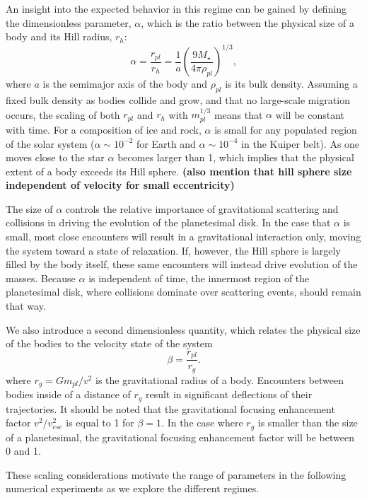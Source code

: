 \documentclass[twocolumn]{aastex63}
\begin{document}
An insight into the expected behavior in this regime can be gained by
defining the dimensionless parameter, $\alpha$, which is the ratio
between the physical size of a body and its Hill radius, $r_{h}$:
\begin{equation}\label{eq:alpha}
	\alpha = \frac{r_{pl}}{r_{h}} = \frac{1}{a} \left( \frac{9 M_{\star}}{4 \pi \rho_{pl}} \right)^{1/3},
\end{equation}
where $a$ is the semimajor axis of the body and $\rho_{pl}$ is its
bulk density. Assuming a fixed bulk density as bodies collide and
grow, and that no large-scale migration occurs, the scaling of both
$r_{pl}$ and $r_{h}$ with $m_{pl}^{1/3}$ means that $\alpha$ will be
constant with time. For a composition of ice and rock, $\alpha$ is
small for any populated region of the solar system ($\alpha \sim
10^{-2}$ for Earth and $\alpha \sim 10^{-4}$ in the Kuiper belt). As
one moves close to the star $\alpha$ becomes larger than 1, which
implies that the physical extent of a body exceeds its Hill sphere.
{\bf(also mention that hill sphere size independent of velocity for small eccentricity)}

The size of $\alpha$ controls the relative importance of gravitational scattering and collisions in driving the evolution of the planetesimal disk. In the case that $\alpha$ is small, most close encounters will result in a gravitational interaction only, moving the system toward a state of relaxation. If, however, the Hill sphere is largely filled by the body itself, these same encounters will instead drive evolution of the masses. Because $\alpha$ is independent of time, the innermost region of the planetesimal disk, where collisions dominate over scattering events, should remain that way.

We also introduce a second dimensionless quantity, which relates the physical size of the bodies to the velocity state of the system
\begin{equation}\label{eq:beta}
	\beta = \frac{r_{pl}}{r_{g}}.
\end{equation}
where $r_{g} = G m_{pl} / v^{2}$ is the gravitational radius of a body. Encounters between bodies inside of a distance of $r_{g}$ result in significant deflections of their trajectories. It should be noted that the gravitational focusing enhancement factor $v^{2}/v_{esc}^{2}$ is equal to 1 for $\beta = 1$. In the case where $r_{g}$ is smaller than the size of a planetesimal, the gravitational focusing enhancement factor will be between 0 and 1.

These scaling considerations motivate the range of parameters in the
following numerical experiments as we explore the different regimes.
\end{document}
